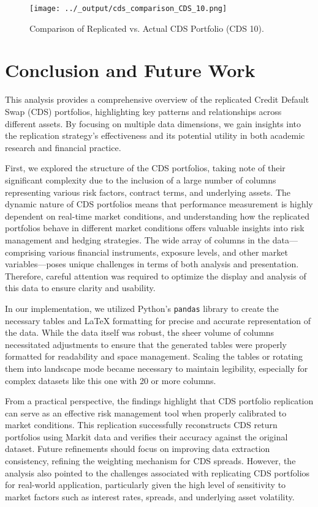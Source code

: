 \documentclass{article}
\begin{document}
\begin{figure}[H]
    \centering
    \texttt{[image: ../\_output/cds\_comparison\_CDS\_10.png]}  %
    \caption{\label{fig:cds_comparison}Comparison of Replicated vs. Actual CDS Portfolio (CDS 10).}
\end{figure}

\section{Conclusion and Future Work}




This analysis provides a comprehensive overview of the replicated Credit Default Swap (CDS) portfolios, highlighting key patterns and relationships across different assets. By focusing on multiple data dimensions, we gain insights into the replication strategy's effectiveness and its potential utility in both academic research and financial practice.

First, we explored the structure of the CDS portfolios, taking note of their significant complexity due to the inclusion of a large number of columns representing various risk factors, contract terms, and underlying assets. The dynamic nature of CDS portfolios means that performance measurement is highly dependent on real-time market conditions, and understanding how the replicated portfolios behave in different market conditions offers valuable insights into risk management and hedging strategies. The wide array of columns in the data—comprising various financial instruments, exposure levels, and other market variables—poses unique challenges in terms of both analysis and presentation. Therefore, careful attention was required to optimize the display and analysis of this data to ensure clarity and usability.

In our implementation, we utilized Python’s \texttt{pandas} library to create the necessary tables and LaTeX formatting for precise and accurate representation of the data. While the data itself was robust, the sheer volume of columns necessitated adjustments to ensure that the generated tables were properly formatted for readability and space management. Scaling the tables or rotating them into landscape mode became necessary to maintain legibility, especially for complex datasets like this one with 20 or more columns. 

From a practical perspective, the findings highlight that CDS portfolio replication can serve as an effective risk management tool when properly calibrated to market conditions. This replication successfully reconstructs CDS return portfolios using Markit data and verifies their accuracy against the original dataset. Future refinements should focus on improving data extraction consistency, refining the weighting mechanism for CDS spreads. However, the analysis also pointed to the challenges associated with replicating CDS portfolios for real-world application, particularly given the high level of sensitivity to market factors such as interest rates, spreads, and underlying asset volatility.
\end{document}
